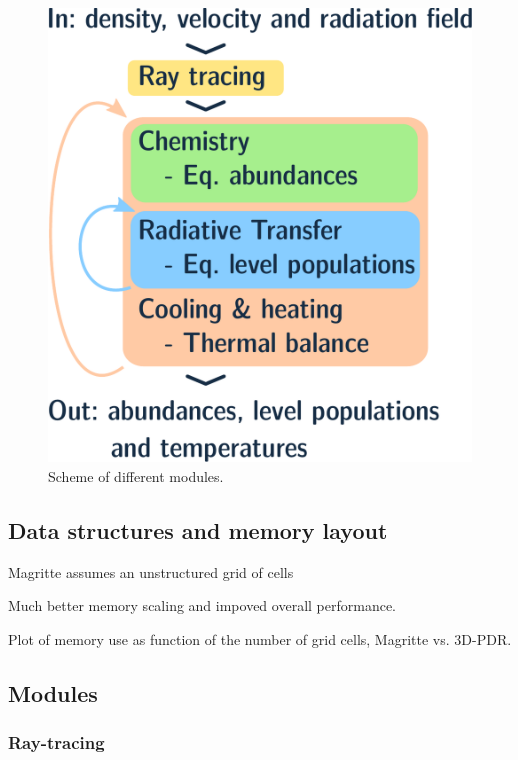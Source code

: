 \documentclass[a4paper,fleqn,usenatbib]{mnras}
\begin{document}
\begin{figure}
	\includegraphics[width=\columnwidth]{figures/scheme.pdf}
  \caption{Scheme of different modules.}
  \label{scheme}
\end{figure}



\subsection{Data structures and memory layout}

Magritte assumes an unstructured grid of cells


Much better memory scaling and impoved overall performance.

Plot of memory use as function of the number of grid cells, Magritte vs. 3D-PDR.


\subsection{Modules}



\subsubsection{Ray-tracing}
\end{document}
